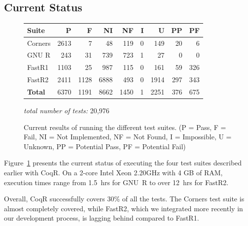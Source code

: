 \documentclass[
    sigplan,
    10pt,
    review, %
    natbib=false %
 ]{acmart}
\newcommand\eti[1]{\todo[color=blue!20,inline]{#1}}
\newcommand\CoqR{CoqR}
\begin{document}



\subsection{Current Status}
\label{sec:testing-results}



\begin{figure}[]
\centering
\begin{tabular}{|l||r|r|r|r|r|r|r|r|}
\hline
{\bf Suite}  & {\bf P} & {\bf F} & {\bf NI} & {\bf NF} & {\bf I}
& {\bf U} & {\bf PP} & {\bf PF} \\ \hline\hline
Corners     & 2613 & 7    & 48    &   119    & 0   & 149  &   20  & 6 \\ \hline
GNU R       & 243  & 31   & 739   &   723    & 1   & 27   &   0   & 0 \\ \hline
FastR1      & 1103 & 25   & 987   &    115     & 0   & 161  &   59  & 326 \\ \hline
FastR2      & 2411 & 1128 & 6888  &   493   & 0   & 1914  &   297 & 343 \\ \hline\hline
{\bf Total} & 6370 & 1191 & 8662  &   1450   &  1 & 2251  &   376 & 675 \\
\hline
\end{tabular}
{\em total number of tests:} 20,976
\caption{Current results of running the different test suites.
{\footnotesize (P = Pass, F = Fail, NI = Not Implemented, NF = Not Found, I = Impossible, \newline U = Unknown, PP = Potential Pass, PF = Potential Fail)}}
\label{fig:results}
\end{figure}


Figure~\ref{fig:results} presents the current status of executing the four test suites described earlier with \CoqR{}. On a 2-core Intel Xeon 2.20GHz with 4 GB of RAM, execution times range from 1.5~hrs for GNU~R to over 12~hrs for FastR2.

Overall, \CoqR{} successfully covers 30\% of all the tests. The Corners test suite is almost completely covered, while FastR2, which we integrated more recently in our development process, is lagging behind compared to FastR1.
\end{document}

